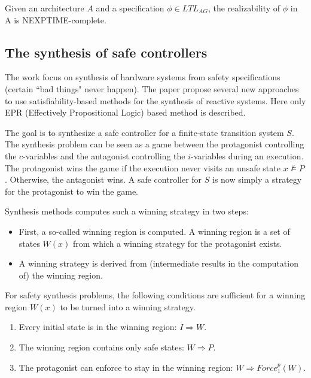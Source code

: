 \documentclass[runningheads]{llncs}
\begin{document}
\begin{theorem}
  Given an architecture $A$ and a specification $\phi \in LTL_{AG}$, the realizability of $\phi$ in A is NEXPTIME-complete.
\end{theorem}

\subsection{The synthesis of safe controllers}
The work \cite{bloemks14} focus on synthesis of hardware systems from safety specifications (certain ``bad things" never happen).
The paper propose several new approaches to use satisfiability-based methods for the synthesis of reactive systems.
Here only EPR (Effectively Propositional Logic) based method is described.

The goal is to synthesize a safe controller for a finite-state transition system $S$.
The synthesis problem can be seen as a game between the protagonist controlling the $c$-variables and the antagonist controlling
the $i$-variables during an execution.
The protagonist wins the game if the execution never visits an unsafe state $x \not\models P$. Otherwise, the antagonist wins. 
A safe controller for $S$ is now simply a strategy for the protagonist to win the game.

Synthesis methods computes such a winning strategy in two steps:
\begin{itemize}
  \item First, a so-called winning region is computed. 
  A winning region is a set of states $W(x)$ from
  which a winning strategy for the protagonist exists.
  \item A winning strategy
  is derived from (intermediate results in the computation of) the winning region.
\end{itemize}

For safety synthesis problems, the following conditions are
sufficient for a winning region $W(x)$ to be turned into a winning strategy.
\begin{enumerate}
  \item Every initial state is in the winning region: $I \Rightarrow W$.
  \item The winning region contains only safe states: $W \Rightarrow P$.
  \item The protagonist can enforce to stay in the winning region: $W \Rightarrow Force^p_{1}(W)$.
\end{enumerate}
\end{document}
